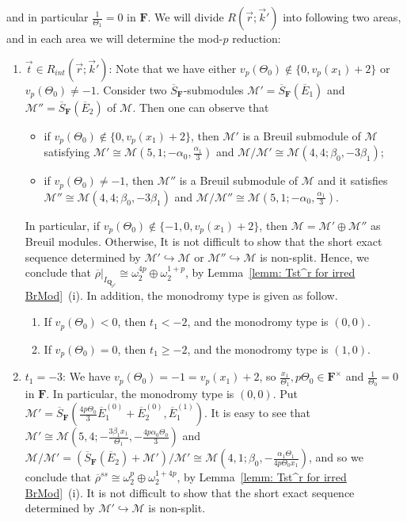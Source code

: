 \documentclass[11pt]{amsart}
\theoremstyle{definition}
\numberwithin{equation}{subsection}
\theoremstyle{plain}
\theoremstyle{plain}
\theoremstyle{plain}
\theoremstyle{plain}
\theoremstyle{plain}
\theoremstyle{plain}
\theoremstyle{plain}
\theoremstyle{plain}
\theoremstyle{plain}
\theoremstyle{plain}
\theoremstyle{plain}
\theoremstyle{plain}
\theoremstyle{definition}
\theoremstyle{definition}
\theoremstyle{definition}
\theoremstyle{remark}
\renewcommand{\(}{\textup{(}}
\renewcommand{\)}{\textup{)}}
\newcommand{\Q}{\mathbf{Q}}
\newcommand{\F}{\mathbf{F}}
\newcommand{\barS}{\overline{S}}
\newcommand{\rhobar}{\overline{\rho}}
\newcommand{\cM}{\mathcal{M}}
\newcommand{\barE}{\overline{E}}
\newcommand{\vr}{\vec{r}}
\newcommand{\vk}{\vec{k}}
\newcommand{\IQptwo}{{I_{\Q_{p^2}}}}
\begin{document}
and in particular $\frac{1}{\Theta_1}=0$ in $\F$. We will divide $R(\vr;\vk')$ into following two areas, and in each area we will determine the mod-$p$ reduction:
\begin{enumerate}[leftmargin=*]
  \item $\vec{t}\in R_{int}(\vr;\vk')$: Note that we have either $v_p(\Theta_0)\not\in\{0,v_p(x_1)+2\}$ or $v_p(\Theta_0)\neq -1$. Consider two $\barS_{\F}$-submodules $\cM'=\barS_{\F}(\barE_1)$ and $\cM''=\barS_{\F}(\barE_2)$ of $\cM$. Then one can observe that
    \begin{itemize}[leftmargin=*]
      \item if $v_p(\Theta_0)\not\in\{0,v_p(x_1)+2\}$, then $\cM'$ is a Breuil submodule of $\cM$ satisfying $\cM'\cong\cM(5,1;-\alpha_0,\frac{\alpha_1}{3})$ and $\cM/\cM'\cong\cM(4,4;\beta_0,-3\beta_1)$;
      \item if $v_p(\Theta_0)\neq -1$, then $\cM''$ is a Breuil submodule of $\cM$ and it satisfies $\cM''\cong\cM(4,4;\beta_0,-3\beta_1)$ and $\cM/\cM''\cong\cM(5,1;-\alpha_0,\frac{\alpha_1}{3})$.
    \end{itemize}
    In particular, if $v_p(\Theta_0)\not\in\{-1,0,v_p(x_1)+2\}$, then $\cM=\cM'\oplus\cM''$ as Breuil modules. Otherwise, It is not difficult to show that the short exact sequence determined by $\cM'\hookrightarrow \cM$ or $\cM''\hookrightarrow\cM$ is non-split. Hence, we conclude that $\rhobar|_\IQptwo\cong\omega_2^{4p}\oplus\omega_2^{1+p}$, by Lemma~\ref{lemm: Tst^r for irred BrMod}~(i). In addition, the monodromy type is given as follow.
    \begin{enumerate}[leftmargin=*]
      \item If $v_p(\Theta_0)<0$, then $t_1<-2$, and the monodromy type is $(0,0)$.
      \item If $v_p(\Theta_0)=0$, then $t_1\geq -2$, and the monodromy type is $(1,0)$.
    \end{enumerate}
  \item $t_1=-3$: We have $v_p(\Theta_0)=-1=v_p(x_1)+2$, so $\frac{x_1}{\Theta_1},p\Theta_0\in\F^\times$ and $\frac{1}{\Theta_0}=0$ in $\F$. In particular, the monodromy type is $(0,0)$. Put $\cM'=\barS_{\F}(\frac{4p\Theta_0}{3}\barE_1^{(0)}+\barE_2^{(0)},\barE_1^{(1)})$. It is easy to see that $\cM'\cong\cM(5,4;-\frac{3\beta_1x_1}{\Theta_1},-\frac{4p\alpha_0\Theta_0}{3})$ and $\cM/\cM'=(\barS_{\F}(\barE_2)+\cM')/\cM'\cong\cM(4,1;\beta_0,-\frac{\alpha_1\Theta_1}{4p\Theta_0x_1})$, and so we conclude that $\rhobar^{ss}\cong\omega_2^p\oplus\omega_2^{1+4p}$, by Lemma~\ref{lemm: Tst^r for irred BrMod}~(i). It is not difficult to show that the short exact sequence determined by $\cM'\hookrightarrow \cM$ is non-split.
\end{enumerate}
\end{document}
